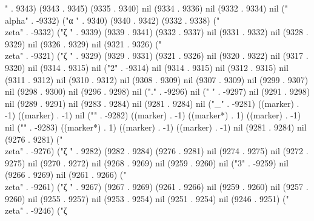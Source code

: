 {{" . 9343) (9343 . 9345) (9335 . 9340) nil (9334 . 9336) nil (9332 . 9334) nil ("\\alpha" . -9332) ("α
" . 9340) (9340 . 9342) (9332 . 9338) ("\\zeta" . -9332) ("ζ
" . 9339) (9339 . 9341) (9332 . 9337) nil (9331 . 9332) nil (9328 . 9329) nil (9326 . 9329) nil (9321 . 9326) ("\\zeta" . -9321) ("ζ
" . 9329) (9329 . 9331) (9321 . 9326) nil (9320 . 9322) nil (9317 . 9320) nil (9314 . 9315) nil ("2" . -9314) nil (9314 . 9315) nil (9312 . 9315) nil (9311 . 9312) nil (9310 . 9312) nil (9308 . 9309) nil (9307 . 9309) nil (9299 . 9307) nil (9298 . 9300) nil (9296 . 9298) nil ("." . -9296) nil (" " . -9297) nil (9291 . 9298) nil (9289 . 9291) nil (9283 . 9284) nil (9281 . 9284) nil ("_" . -9281) ((marker) . -1) ((marker) . -1) nil ("{" . -9282) ((marker) . -1) ((marker*) . 1) ((marker) . -1) nil ("}" . -9283) ((marker*) . 1) ((marker) . -1) ((marker) . -1) nil (9281 . 9284) nil (9276 . 9281) ("\\zeta" . -9276) ("ζ
" . 9282) (9282 . 9284) (9276 . 9281) nil (9274 . 9275) nil (9272 . 9275) nil (9270 . 9272) nil (9268 . 9269) nil (9259 . 9260) nil ("3" . -9259) nil (9266 . 9269) nil (9261 . 9266) ("\\zeta" . -9261) ("ζ
" . 9267) (9267 . 9269) (9261 . 9266) nil (9259 . 9260) nil (9257 . 9260) nil (9255 . 9257) nil (9253 . 9254) nil (9251 . 9254) nil (9246 . 9251) ("\\zeta" . -9246) ("ζ
}}

